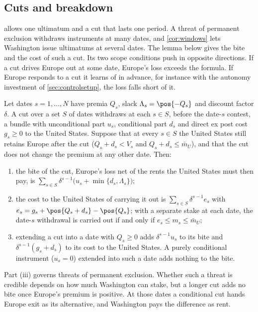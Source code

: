 \subsection{Cuts and breakdown}\label{app:cuts}

 allows one ultimatum and a cut that lasts one period. A threat of permanent exclusion withdraws instruments at many dates, and \cref{cor:windows} lets Washington issue ultimatums at several dates. The lemma below gives the bite and the cost of such a cut. Its two scope conditions push in opposite directions. If a cut drives Europe out at some date, Europe's loss exceeds the formula. If Europe responds to a cut it learns of in advance, for instance with the autonomy investment of \cref{sec:controlsetup}, the loss falls short of it.

\begin{lemma}\label{lem:selflimit}
Let dates $s=1,\dots,N$ have premia $Q_s$, slack $\Lambda_s=\pos{-Q_s}$ and discount factor $\delta$. A cut over a set $S$ of dates withdraws at each $s\in S$, before the date-$s$ contest, a bundle with unconditional part $u_s$, conditional part $d_s$ and direct ex post cost $g_s\ge 0$ to the United States. Suppose that at every $s\in S$ the United States still retains Europe after the cut ($Q_s+d_s<V_s$ and $Q_s+d_s\le\bar m_U$), and that the cut does not change the premium at any other date. Then:
\begin{enumerate}[label=(\roman*)]
\item the bite of the cut, Europe's loss net of the rents the United States must then pay, is $\sum_{s\in S}\delta^{s-1}\big(u_s+\min\{d_s,\Lambda_s\}\big)$;
\item the cost to the United States of carrying it out is $\sum_{s\in S}\delta^{s-1}e_s$ with $e_s=g_s+\pos{Q_s+d_s}-\pos{Q_s}$; with a separate stake at each date, the date-$s$ withdrawal is carried out if and only if $e_s\le m_s\le\bar m_U$;
\item extending a cut into a date with $Q_s\ge 0$ adds $\delta^{s-1}u_s$ to its bite and $\delta^{s-1}(g_s+d_s)$ to its cost to the United States. A purely conditional instrument ($u_s=0$) extended into such a date adds nothing to the bite.
\end{enumerate}
\end{lemma}

Part (iii) governs threats of permanent exclusion. Whether such a threat is credible depends on how much Washington can stake, but a longer cut adds no bite once Europe's premium is positive. At those dates a conditional cut hands Europe exit as its alternative, and Washington pays the difference as rent.

